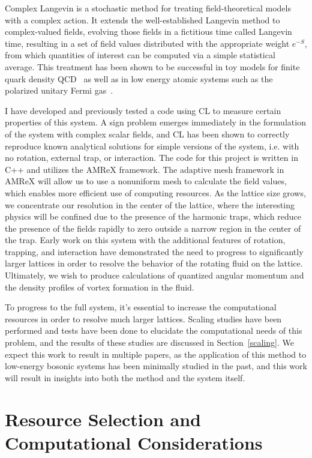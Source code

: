 \documentclass[onecolumn, 12pt]{article}
\begin{document}
Complex Langevin is a stochastic method for treating field-theoretical models with a complex action. It extends the well-established Langevin method to complex-valued fields, evolving those fields in a fictitious time called Langevin time, resulting in a set of field values distributed with the appropriate weight $e^{-S}$, from which quantities of interest can be computed via a simple statistical average. This treatment has been shown to be successful in toy models for finite quark density QCD~\cite{BergerCLReview} as well as in low energy atomic systems such as the polarized unitary Fermi gas~\cite{BergerCLReview}. 

I have developed and previously tested a code using CL to measure certain properties of this system. A sign problem emerges immediately in the formulation of the system with complex scalar fields, and CL has been shown to correctly reproduce known analytical solutions for simple versions of the system, i.e. with no rotation, external trap, or interaction. The code for this project is written in C++ and utilizes the AMReX framework. The adaptive mesh framework in AMReX will allow us to use a nonuniform mesh to calculate the field values, which enables more efficient use of computing resources. As the lattice size grows, we concentrate our resolution in the center of the lattice, where the interesting physics will be confined due to the presence of the harmonic traps, which reduce the presence of the fields rapidly to zero outside a narrow region in the center of the trap. Early work on this system with the additional features of rotation, trapping, and interaction have demonstrated the need to progress to significantly larger lattices in order to resolve the behavior of the rotating fluid on the lattice. Ultimately, we wish to produce calculations of quantized angular momentum and the density profiles of vortex formation in the fluid. 

To progress to the full system, it's essential to increase the computational resources in order to resolve much larger lattices. Scaling studies have been performed and tests have been done to elucidate the computational needs of this problem, and the results of these studies are discussed in Section~\ref{scaling}. We expect this work to result in multiple papers, as the application of this method to low-energy bosonic systems has been minimally studied in the past, and this work will result in insights into both the method and the system itself.

\section{Resource Selection and Computational Considerations}
\end{document}
